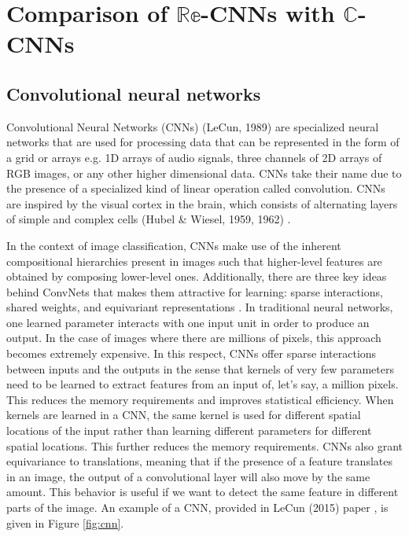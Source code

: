 \chapter{Comparison of $\mathbb{Re}$-CNNs with $\mathbb{C}$-CNNs}\label{chap:comparison}
 
 
 \section{Convolutional neural networks}\label{cnn41}
 
 Convolutional Neural Networks (CNNs) (LeCun, 1989) \cite{lecun1989backpropagation} are specialized neural networks that are used for processing data that can be represented in the form of a grid or arrays e.g. 1D arrays of audio signals, three channels of 2D arrays of RGB images, or any other higher dimensional data. CNNs take their name due to the presence of a specialized kind of linear operation called convolution. CNNs are inspired by the visual cortex in the brain, which consists of alternating layers of simple and complex cells  (Hubel \& Wiesel, 1959, 1962) \cite{hubel1959receptive}\cite{hubel1962receptive}. 
 
In the context of image classification, CNNs make use of the inherent compositional hierarchies present in images such that higher-level features are obtained by composing lower-level ones. Additionally, there are three key ideas behind ConvNets that makes them attractive for learning: sparse interactions, shared weights, and equivariant representations \cite{DeepLearning}. In traditional neural networks, one learned parameter interacts with one input unit in order to produce an output. In the case of images where there are millions of pixels, this approach becomes extremely expensive. In this respect, CNNs offer sparse interactions between inputs and the outputs in the sense that kernels of very few parameters need to be learned to extract features from an input of, let's say, a million pixels. This reduces the memory requirements and improves statistical efficiency.  When kernels are learned in a CNN, the same kernel is used for different spatial locations of the input rather than learning different parameters for different spatial locations. This further reduces the memory requirements. CNNs also grant equivariance to translations, meaning that if the presence of a feature translates in an image, the output of a convolutional layer will also move by the same amount. This behavior is useful if we want to detect the same feature in different parts of the image. An example of a CNN, provided in LeCun (2015) paper \cite{nature}, is given in Figure \ref{fig:cnn}.

